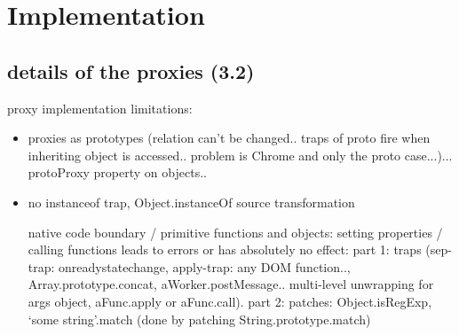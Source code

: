 \chapter{Implementation} \label{sec:IMPLEMENTATION}


\section{details of the proxies (3.2)}




proxy implementation limitations: 
\begin{itemize}
    \item proxies as prototypes (relation can’t be changed.. traps of proto fire when inheriting object is accessed.. problem is Chrome and only the proto case...)... protoProxy property on objects..
    \item no instanceof trap, Object.instanceOf source transformation 
    \item [native code] boundary / primitive functions and objects: setting properties / calling functions leads to errors or has absolutely no effect: part 1: traps (sep-trap: onreadystatechange, apply-trap: any DOM function.., Array.prototype.concat, aWorker.postMessage.. multi-level unwrapping for args object, aFunc.apply or aFunc.call).
part 2: patches: Object.isRegExp, ‘some string’.match (done by patching String.prototype.match)
\end{itemize}


